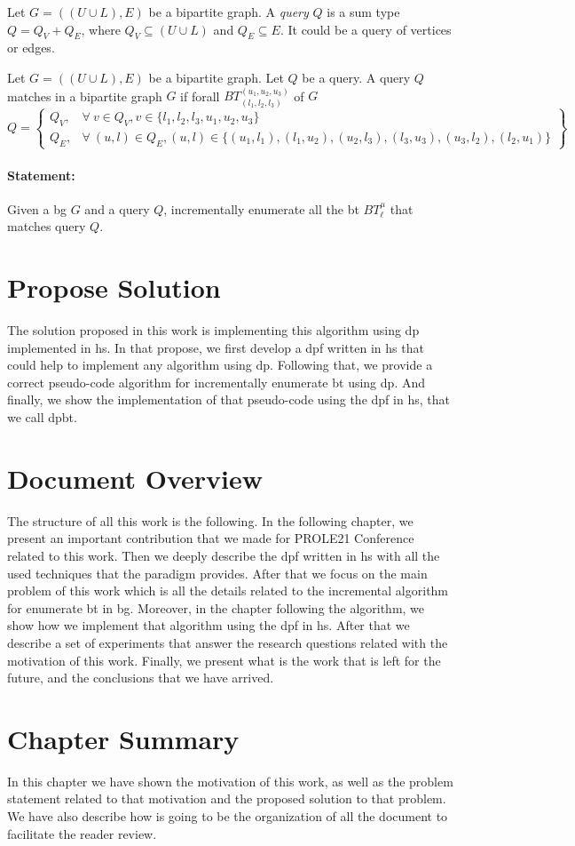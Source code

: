 \begin{definition}[Query]
Let $G=((U\cup L),E)$ be a bipartite graph. 
A \textit{query} $Q$ is a sum type $Q = Q_V + Q_E$, where $Q_V \subseteq (U \cup L)$ and $Q_E \subseteq E$. 
It could be a query of vertices or edges.
\end{definition}

\begin{definition}
  Let $G=((U\cup L),E)$ be a bipartite graph.
  Let $Q$ be a query.
  A query $Q$ matches in a bipartite graph $G$ if forall $BT_{(l_1,l_2,l_3)}^{(u_1,u_2,u_3)}$ of $G$
  \[
    Q = \left\{\begin{array}{lr}
      Q_V, & \forall\ v \in Q_V, v \in \{l_1,l_2,l_3,u_1,u_2,u_3\}\\
      Q_E, & \forall\ (u,l) \in Q_E, (u,l) \in \{(u_1, l_1), (l_1,u_2), (u_2, l_3), (l_3,u_3), (u_3, l_2), (l_2,u_1)\} 
      \end{array}\right\} 
  \]
  \end{definition}
  
\paragraph{Statement:}Given a \acrlong{bg} $G$ and a query $Q$, incrementally enumerate all the \acrlong{bt} $BT_{\ell}^{\mu}$ that matches query $Q$.

\section{Propose Solution}
The solution proposed in this work is implementing this algorithm using \acrfull{dp} implemented in \acrfull{hs}.
In that propose, we first develop a \acrlong{dpf} written in \acrlong{hs} that could help to implement any algorithm using \acrshort{dp}.
Following that, we provide a correct pseudo-code algorithm for incrementally enumerate \acrshort{bt} using \acrshort{dp}. And finally, we  
show the implementation of that pseudo-code using the \acrshort{dpf} in \acrshort{hs}, that we call \acrfull{dpbt}.


\section{Document Overview}
The structure of all this work is the following. In the following chapter, we present an important contribution that we made for PROLE21 Conference~\cite{prole21} related to 
this work. Then we deeply describe the \acrshort{dpf} written in \acrshort{hs} with all the used techniques that the paradigm provides.
After that we focus on the main problem of this work which is all the details related to the incremental algorithm for enumerate \acrshort{bt} in \acrshort{bg}.
Moreover, in the chapter following the algorithm, we show how we implement that algorithm using the \acrshort{dpf} in \acrshort{hs}. After that we describe a set 
of experiments that answer the research questions related with the motivation of this work. Finally, we present what is the work that is left for the future, and the conclusions that
we have arrived.

\section{Chapter Summary}
In this chapter we have shown the motivation of this work, as well as the problem statement related to that motivation and the proposed solution to that problem.
We have also describe how is going to be the organization of all the document to facilitate the reader review.
